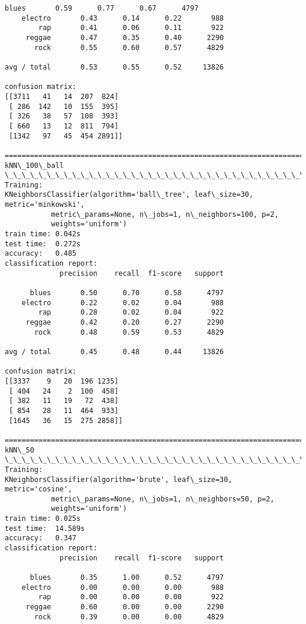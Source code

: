 \documentclass[11pt]{article}
\begin{document}
\begin{Verbatim}[commandchars=\\\{\}]
      blues       0.59      0.77      0.67      4797
    electro       0.43      0.14      0.22       988
        rap       0.41      0.06      0.11       922
     reggae       0.47      0.35      0.40      2290
       rock       0.55      0.60      0.57      4829

avg / total       0.53      0.55      0.52     13826

confusion matrix:
[[3711   41   14  207  824]
 [ 286  142   10  155  395]
 [ 326   38   57  108  393]
 [ 660   13   12  811  794]
 [1342   97   45  454 2891]]

================================================================================
kNN\_100\_ball
\_\_\_\_\_\_\_\_\_\_\_\_\_\_\_\_\_\_\_\_\_\_\_\_\_\_\_\_\_\_\_\_\_\_\_\_\_\_\_\_\_\_\_\_\_\_\_\_\_\_\_\_\_\_\_\_\_\_\_\_\_\_\_\_\_\_\_\_\_\_\_\_\_\_\_\_\_\_\_\_
Training: 
KNeighborsClassifier(algorithm='ball\_tree', leaf\_size=30, metric='minkowski',
           metric\_params=None, n\_jobs=1, n\_neighbors=100, p=2,
           weights='uniform')
train time: 0.042s
test time:  0.272s
accuracy:   0.485
classification report:
             precision    recall  f1-score   support

      blues       0.50      0.70      0.58      4797
    electro       0.22      0.02      0.04       988
        rap       0.28      0.02      0.04       922
     reggae       0.42      0.20      0.27      2290
       rock       0.48      0.59      0.53      4829

avg / total       0.45      0.48      0.44     13826

confusion matrix:
[[3337    9   20  196 1235]
 [ 404   24    2  100  458]
 [ 382   11   19   72  438]
 [ 854   28   11  464  933]
 [1645   36   15  275 2858]]

================================================================================
kNN\_50
\_\_\_\_\_\_\_\_\_\_\_\_\_\_\_\_\_\_\_\_\_\_\_\_\_\_\_\_\_\_\_\_\_\_\_\_\_\_\_\_\_\_\_\_\_\_\_\_\_\_\_\_\_\_\_\_\_\_\_\_\_\_\_\_\_\_\_\_\_\_\_\_\_\_\_\_\_\_\_\_
Training: 
KNeighborsClassifier(algorithm='brute', leaf\_size=30, metric='cosine',
           metric\_params=None, n\_jobs=1, n\_neighbors=50, p=2,
           weights='uniform')
train time: 0.025s
test time:  14.589s
accuracy:   0.347
classification report:
             precision    recall  f1-score   support

      blues       0.35      1.00      0.52      4797
    electro       0.00      0.00      0.00       988
        rap       0.00      0.00      0.00       922
     reggae       0.60      0.00      0.00      2290
       rock       0.39      0.00      0.00      4829


\end{Verbatim}
\end{document}
